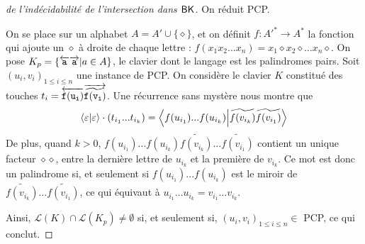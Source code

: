 \documentclass[12pt, a4paper]{article}
\renewcommand{\L}{\mathcal{L}}
\begin{document}
    \begin{proof}[de l'indécidabilité de l'intersection dans $\mathsf{BK}$] 
        
        On réduit PCP.

        On se place sur un alphabet $A = A' \cup \{\diamond\}$, et on définit $f : A'^* \to A^*$ la fonction qui ajoute un $\diamond$ à droite de chaque lettre : $f(x_1x_2\dots x_n) = x_1\diamond x_2 \diamond \dots x_n \diamond$.
        On pose $K_p = \{\overleftarrow{\mathtt{a}}\overrightarrow{\mathtt{a}} | a \in A\}$, le clavier dont le langage est les palindromes pairs.
        Soit $(u_i,v_i)_{1\leqslant i \leqslant n}$ une instance de PCP. On considère le clavier $K$ constitué des touches $t_i = \overleftarrow{\mathtt{f(u_i)}}\overrightarrow{\mathtt{\widetilde{f(v_i)}}}$.
        Une récurrence sans mystère nous montre que 
        \[\left\langle \varepsilon \middle| \varepsilon \right\rangle\cdot(t_{i_1}...t_{i_k}) = \left\langle f(u_{i_1})...f(u_{i_k}) \middle| \widetilde{f(v_{i_k})}\widetilde{f(v_{i_1})} \right\rangle\]
        De plus, quand $k>0$, $f(u_{i_1})...f(u_{i_k})\widetilde{f(v_{i_k})}\dots\widetilde{f(v_{i_1})}$ contient un unique facteur $\diamond\diamond$, 
        entre la dernière lettre de $u_{i_k}$ et la première de $v_{i_k}$. Ce mot est donc un palindrome si, et seulement si
        $f(u_{i_1})...f(u_{i_k})$ est le miroir de $\widetilde{f(v_{i_k})}\dots\widetilde{f(v_{i_1})}$, ce qui équivaut à $u_{i_1}\dots u_{i_k} = v_{i_1} \dots v_{i_k}$.

        Ainsi, $\L(K) \cap \L(K_p) \neq \emptyset$ si, et seulement si, $(u_i,v_i)_{1\leqslant i \leqslant n} \in$ PCP, ce qui conclut.        
    \end{proof}
    \clearpage
    \printbibliography
\end{document}
